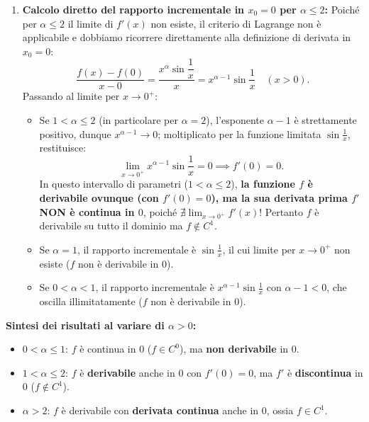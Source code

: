 \begin{esbox}[Esercizio svolto — Studio completo di $f(x) = x^\alpha \sin\frac{1}{x}$ per $\alpha > 0$]
\begin{enumerate}
    \item \textbf{Calcolo diretto del rapporto incrementale in $x_0 = 0$ per $\alpha \le 2$:} Poiché per $\alpha \le 2$ il limite di $f'(x)$ non esiste, il criterio di Lagrange non è applicabile e dobbiamo ricorrere direttamente alla definizione di derivata in $x_0 = 0$:
    \[
        \frac{f(x) - f(0)}{x - 0} = \frac{x^\alpha \sin\dfrac{1}{x}}{x} = x^{\alpha - 1} \sin\frac{1}{x} \quad (x > 0).
    \]
    Passando al limite per $x \to 0^+$:
    \begin{itemize}
        \item Se \textbf{$1 < \alpha \le 2$} (in particolare per $\alpha = 2$), l'esponente $\alpha - 1$ è strettamente positivo, dunque $x^{\alpha - 1} \to 0$; moltiplicato per la funzione limitata $\sin\frac{1}{x}$, restituisce:
        \[
            \lim_{x \to 0^+} x^{\alpha - 1} \sin\frac{1}{x} = 0 \implies f'(0) = 0.
        \]
        In questo intervallo di parametri ($1 < \alpha \le 2$), \textbf{la funzione $f$ è derivabile ovunque (con $f'(0) = 0$), ma la sua derivata prima $f'$ NON è continua in $0$}, poiché $\nexists \lim_{x \to 0^+} f'(x)$! Pertanto $f$ è derivabile su tutto il dominio ma $f \notin C^1$.
        \item Se \textbf{$\alpha = 1$}, il rapporto incrementale è $\sin\frac{1}{x}$, il cui limite per $x \to 0^+$ non esiste ($f$ non è derivabile in $0$).
        \item Se \textbf{$0 < \alpha < 1$}, il rapporto incrementale è $x^{\alpha - 1} \sin\frac{1}{x}$ con $\alpha - 1 < 0$, che oscilla illimitatamente ($f$ non è derivabile in $0$).
    \end{itemize}
\end{enumerate}

\noindent\textbf{Sintesi dei risultati al variare di $\alpha > 0$:}
\begin{itemize}
    \item $0 < \alpha \le 1$: $f$ è continua in $0$ ($f \in C^0$), ma \textbf{non derivabile} in $0$.
    \item $1 < \alpha \le 2$: $f$ è \textbf{derivabile} anche in $0$ con $f'(0) = 0$, ma $f'$ è \textbf{discontinua} in $0$ ($f \notin C^1$).
    \item $\alpha > 2$: $f$ è derivabile con \textbf{derivata continua} anche in $0$, ossia \textbf{$f \in C^1$}.
\end{itemize}
\end{esbox}